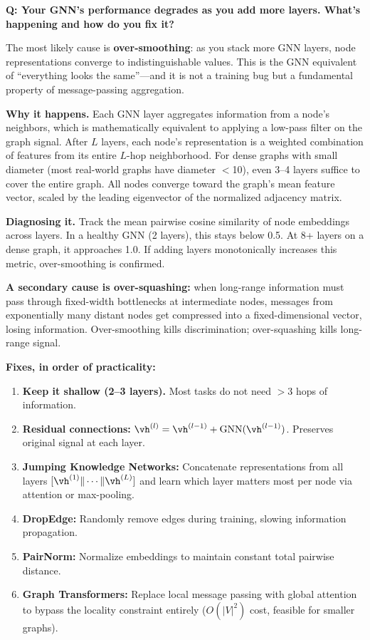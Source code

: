 \begin{interviewq}
\textbf{Q: Your GNN's performance degrades as you add more layers. What's happening and how do you fix it?}

 \quad {} \quad \badgefreq{\freqmed}

\stronganswer

The most likely cause is \textbf{over-smoothing}: as you stack more GNN layers, node representations converge to indistinguishable values. This is the GNN equivalent of ``everything looks the same''---and it is not a training bug but a fundamental property of message-passing aggregation.

\textbf{Why it happens.} Each GNN layer aggregates information from a node's neighbors, which is mathematically equivalent to applying a low-pass filter on the graph signal. After $L$ layers, each node's representation is a weighted combination of features from its entire $L$-hop neighborhood. For dense graphs with small diameter (most real-world graphs have diameter $<$10), even 3--4 layers suffice to cover the entire graph. All nodes converge toward the graph's mean feature vector, scaled by the leading eigenvector of the normalized adjacency matrix.

\textbf{Diagnosing it.} Track the mean pairwise cosine similarity of node embeddings across layers. In a healthy GNN (2 layers), this stays below 0.5. At 8+ layers on a dense graph, it approaches 1.0. If adding layers monotonically increases this metric, over-smoothing is confirmed.

\textbf{A secondary cause is over-squashing:} when long-range information must pass through fixed-width bottlenecks at intermediate nodes, messages from exponentially many distant nodes get compressed into a fixed-dimensional vector, losing information. Over-smoothing kills discrimination; over-squashing kills long-range signal.

\textbf{Fixes, in order of practicality:}
\begin{enumerate}
    \item \textbf{Keep it shallow (2--3 layers).} Most tasks do not need $>$3 hops of information.
    \item \textbf{Residual connections:} $\vh^{(l)} = \vh^{(l-1)} + \text{GNN}(\vh^{(l-1)})$. Preserves original signal at each layer.
    \item \textbf{Jumping Knowledge Networks:} Concatenate representations from all layers $[\vh^{(1)} \| \cdots \| \vh^{(L)}]$ and learn which layer matters most per node via attention or max-pooling.
    \item \textbf{DropEdge:} Randomly remove edges during training, slowing information propagation.
    \item \textbf{PairNorm:} Normalize embeddings to maintain constant total pairwise distance.
    \item \textbf{Graph Transformers:} Replace local message passing with global attention to bypass the locality constraint entirely ($O(|V|^2)$ cost, feasible for smaller graphs).
\end{enumerate}


\end{interviewq}
